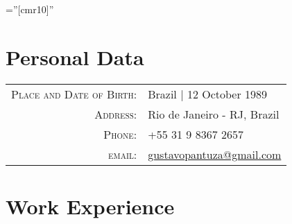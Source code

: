 \documentclass[a4paper,10pt]{article} %
\begin{document}
\pagestyle{empty} %

\font\fb=''[cmr10]'' %





\par{\bigskip\par} %

\section{Personal Data}

\begin{tabular}{rl}
\textsc{Place and Date of Birth:} & Brazil | 12 October 1989 \\
\textsc{Address:} & Rio de Janeiro - RJ, Brazil \\
\textsc{Phone:} & +55 31 9 8367 2657\\
\textsc{email:} & \href{mailto:gustavopantuza@gmail.com}{gustavopantuza@gmail.com}
\end{tabular}





\section{Work Experience}
\end{document}
